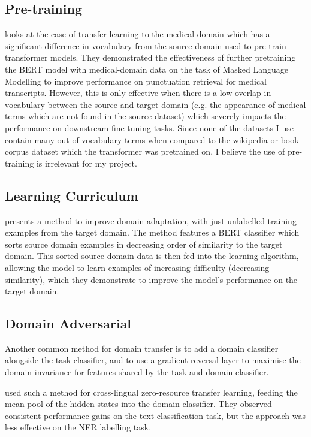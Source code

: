 \documentclass[a4paper]{article}
\begin{document}
\begin{multicols}{2}
\subsection{Pre-training}
\citet{medicalasr} looks at the case of transfer learning to the medical domain which has a significant difference in vocabulary from the source domain used to pre-train transformer models. They demonstrated the effectiveness of further pretraining the BERT model with medical-domain data on the task of Masked Language Modelling to improve performance on punctuation retrieval for medical transcripts. However, this is only effective when there is a low overlap in vocabulary between the source and target domain (e.g. the appearance of medical terms which are not found in the source dataset) which severely impacts the performance on downstream fine-tuning tasks. Since none of the datasets I use contain many out of vocabulary terms when compared to the wikipedia or book corpus dataset which the transformer was pretrained on, I believe the use of pre-training is irrelevant for my project.

\subsection{Learning Curriculum}
\citet{domainAdaptationBERT} presents a method to improve domain adaptation, with just unlabelled training examples from the target domain. The method features a BERT classifier which sorts source domain examples in decreasing order of similarity to the target domain. This sorted source domain data is then fed into the learning algorithm, allowing the model to learn examples of increasing difficulty (decreasing similarity), which they demonstrate to improve the model's performance on the target domain.

\subsection{Domain Adversarial} \label{DA}
Another common method for domain transfer is to add a domain classifier alongside the task classifier, and to use a gradient-reversal layer to maximise the domain invariance for features shared by the task and domain classifier.

\cite{keung2019adversarial} used such a method for cross-lingual zero-resource transfer learning, feeding the mean-pool of the hidden states into the domain classifier. They observed consistent performance gains on the text classification task, but the approach was less effective on the NER labelling task. 


\end{multicols}
\end{document}
